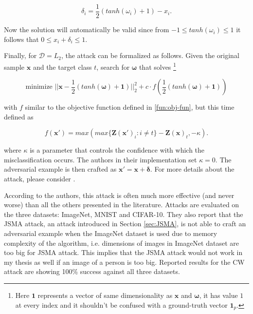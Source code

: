 \[
\delta_i = \frac{1}{2}(tanh(\omega_i) + 1) - x_i.
\] 

Now the solution will automatically be valid since from $-1 \leq tanh(\omega_i) \leq 1$ it follows that $0 \leq x_i + \delta_i \leq 1$.

Finally, for $\mathcal{D} = L_2$, the attack can be formalized as follows. Given the original sample $\pmb x$ and the target class $t$, search for $\pmb \omega$ that solves \footnote{Here $\pmb 1$ represents a vector of same dimensionality as $\pmb x$ and $\pmb \omega$, it has value $1$ at every index and it shouldn't be confused with a ground-truth vector $\pmb 1_p$. }

\[
\text{minimize  }||\pmb x - \frac{1}{2}(tanh(\pmb \omega) + \pmb 1)||_2^2 + c \cdot  f(\frac{1}{2}(tanh(\pmb \omega) + \pmb 1))
\]

with $f$ similar to the objective function defined in \ref{fun:obj-fun}, but this time defined as

\[
f(\pmb x') = max(max\{\pmb Z(\pmb x ')_i : i \neq t\} - \pmb Z(\pmb x)_t, - \kappa).
\]

where $\kappa$ is a parameter that controls the confidence with which the misclassification occurs. The authors in their implementation set $\kappa = 0$. The adversarial example is then crafted as $\pmb x' = \pmb x + \pmb \delta$. For more details about the attack, please consider \cite{DBLP:journals/corr/CarliniW16a}.

According to the authors, this attack is often much more effective (and never worse) than all the others presented in the literature. Attacks are evaluated on the three datasets: ImageNet, MNIST and CIFAR-10. They also report that the JSMA attack, an attack introduced in Section \ref{sec:JSMA}, is not able to craft an adversarial example when the ImageNet dataset is used due to memory complexity of the algorithm, i.e. dimensions of images in ImageNet dataset are too big for JSMA attack. This implies that the JSMA attack would not work in my thesis as well if an image of a person is too big. Reported results for the CW attack are showing 100\% success against all three datasets.







